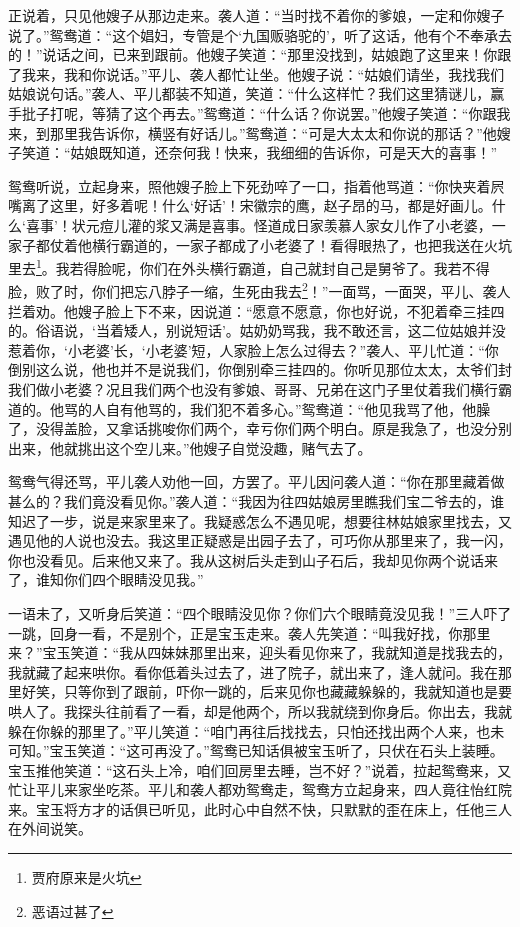 \documentclass[12pt,oneside]{book}
\begin{document}
正说着，只见他嫂子从那边走来。袭人道：“当时找不着你的爹娘，一定和你嫂子说了。”鸳鸯道：“这个娼妇，专管是个‘九国贩骆驼的’，听了这话，他有个不奉承去的！”说话之间，已来到跟前。他嫂子笑道：“那里没找到，姑娘跑了这里来！你跟了我来，我和你说话。”平儿、袭人都忙让坐。他嫂子说：“姑娘们请坐，我找我们姑娘说句话。”袭人、平儿都装不知道，笑道：“什么这样忙？我们这里猜谜儿，赢手批子打呢，等猜了这个再去。”鸳鸯道：“什么话？你说罢。”他嫂子笑道：“你跟我来，到那里我告诉你，横竖有好话儿。”鸳鸯道：“可是大太太和你说的那话？”他嫂子笑道：“姑娘既知道，还奈何我！快来，我细细的告诉你，可是天大的喜事！”

鸳鸯听说，立起身来，照他嫂子脸上下死劲啐了一口，指着他骂道：“你快夹着屄嘴离了这里，好多着呢！什么‘好话’！宋徽宗的鹰，赵子昂的马，都是好画儿。什么‘喜事’！状元痘儿灌的浆又满是喜事。怪道成日家羡慕人家女儿作了小老婆，一家子都仗着他横行霸道的，一家子都成了小老婆了！看得眼热了，也把我送在火坑里去\footnote{贾府原来是火坑}。我若得脸呢，你们在外头横行霸道，自己就封自己是舅爷了。我若不得脸，败了时，你们把忘八脖子一缩，生死由我去\footnote{恶语过甚了}！”一面骂，一面哭，平儿、袭人拦着劝。他嫂子脸上下不来，因说道：“愿意不愿意，你也好说，不犯着牵三挂四的。俗语说，‘当着矮人，别说短话’。姑奶奶骂我，我不敢还言，这二位姑娘并没惹着你，‘小老婆’长，‘小老婆’短，人家脸上怎么过得去？”袭人、平儿忙道：“你倒别这么说，他也并不是说我们，你倒别牵三挂四的。你听见那位太太，太爷们封我们做小老婆？况且我们两个也没有爹娘、哥哥、兄弟在这门子里仗着我们横行霸道的。他骂的人自有他骂的，我们犯不着多心。”鸳鸯道：“他见我骂了他，他臊了，没得盖脸，又拿话挑唆你们两个，幸亏你们两个明白。原是我急了，也没分别出来，他就挑出这个空儿来。”他嫂子自觉没趣，赌气去了。

鸳鸯气得还骂，平儿袭人劝他一回，方罢了。平儿因问袭人道：“你在那里藏着做甚么的？我们竟没看见你。”袭人道：“我因为往四姑娘房里瞧我们宝二爷去的，谁知迟了一步，说是来家里来了。我疑惑怎么不遇见呢，想要往林姑娘家里找去，又遇见他的人说也没去。我这里正疑惑是出园子去了，可巧你从那里来了，我一闪，你也没看见。后来他又来了。我从这树后头走到山子石后，我却见你两个说话来了，谁知你们四个眼睛没见我。”

一语未了，又听身后笑道：“四个眼睛没见你？你们六个眼睛竟没见我！”三人吓了一跳，回身一看，不是别个，正是宝玉走来。袭人先笑道：“叫我好找，你那里来？”宝玉笑道：“我从四妹妹那里出来，迎头看见你来了，我就知道是找我去的，我就藏了起来哄你。看你低着头过去了，进了院子，就出来了，逢人就问。我在那里好笑，只等你到了跟前，吓你一跳的，后来见你也藏藏躲躲的，我就知道也是要哄人了。我探头往前看了一看，却是他两个，所以我就绕到你身后。你出去，我就躲在你躲的那里了。”平儿笑道：“咱门再往后找找去，只怕还找出两个人来，也未可知。”宝玉笑道：“这可再没了。”鸳鸯已知话俱被宝玉听了，只伏在石头上装睡。宝玉推他笑道：“这石头上冷，咱们回房里去睡，岂不好？”说着，拉起鸳鸯来，又忙让平儿来家坐吃茶。平儿和袭人都劝鸳鸯走，鸳鸯方立起身来，四人竟往怡红院来。宝玉将方才的话俱已听见，此时心中自然不快，只默默的歪在床上，任他三人在外间说笑。
\end{document}
